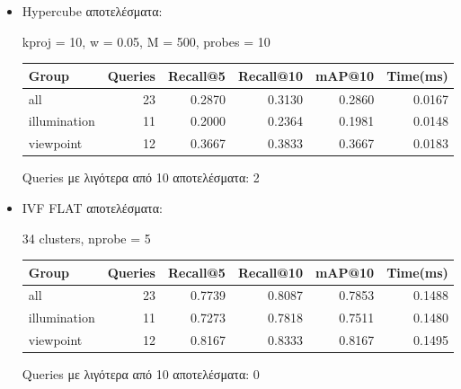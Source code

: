 \documentclass [conference]{IEEEtran}
\begin{document}
\begin{itemize}
    \item Hypercube αποτελέσματα:
    \begin{table}[H]
    \centering
    \small
    \setlength{\tabcolsep}{3pt}
    kproj = 10, w = 0.05, M = 500, probes = 10
    \par\smallskip
    \begin{tabular}{l r r r r r}
    \hline
    \textbf{Group} & \textbf{Queries} & \textbf{Recall@5} & \textbf{Recall@10} & \textbf{mAP@10} & \textbf{Time(ms)} \\
    \hline
    all & 23 & 0.2870 & 0.3130 & 0.2860 & 0.0167 \\
    illumination & 11 & 0.2000 & 0.2364 & 0.1981 & 0.0148 \\
    viewpoint & 12 & 0.3667 & 0.3833 & 0.3667 & 0.0183 \\
    \hline
    \end{tabular}
    \par\smallskip
    \footnotesize Queries με λιγότερα από 10 αποτελέσματα: 2
    \end{table}


    \item IVF FLAT αποτελέσματα:
    \begin{table}[H]
    \centering
    \small
    \setlength{\tabcolsep}{3pt}
    34 clusters, nprobe = 5
    \par\smallskip
    \begin{tabular}{l r r r r r}
    \hline
    \textbf{Group} & \textbf{Queries} & \textbf{Recall@5} & \textbf{Recall@10} & \textbf{mAP@10} & \textbf{Time(ms)} \\
    \hline
    all & 23 & 0.7739 & 0.8087 & 0.7853 & 0.1488 \\
    illumination & 11 & 0.7273 & 0.7818 & 0.7511 & 0.1480 \\
    viewpoint & 12 & 0.8167 & 0.8333 & 0.8167 & 0.1495 \\
    \hline
    \end{tabular}
    \par\smallskip
    \footnotesize Queries με λιγότερα από 10 αποτελέσματα: 0
    \end{table}

        

\end{itemize}
\end{document}
